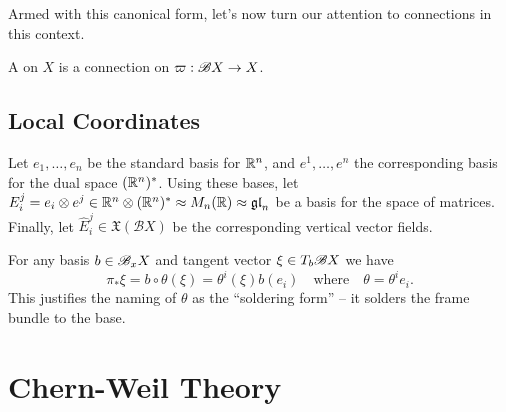 Armed with this canonical form, let's now turn our attention to connections in this context.

\begin{definition}
  A  on $X$ is a connection on $\varpi : \mathscr{B} X \to X$.
\end{definition}

\subsection{Local Coordinates}

Let $e_1,\ldots, e_n$ be the standard basis for $\mathbb{R}^n$, and $e^1,\ldots,e^n$ the corresponding basis for the dual space $(\mathbb{R}^n)^*$. Using these bases, let $E_i^j = e_i\otimes e^j \in \mathbb{R}^n\otimes(\mathbb{R}^n)^* \approx M_n(\mathbb{R}) \approx \mathfrak{gl}_n$ be a basis for the space of matrices. Finally, let $\widehat{E}_i^j\in \mathfrak{X}(\mathscr{B}X)$ be the corresponding vertical vector fields.

For any basis $b\in \mathscr{B}_x X$ and tangent vector $\xi\in T_b \mathscr{B} X$ we have
\[
  \pi_*\xi =  b\circ \theta(\xi) = \theta^i(\xi) b(e_i)\quad\textrm{where}\quad \theta = \theta^i e_i.
\]
This justifies the naming of $\theta$ as the ``soldering form'' -- it solders the frame bundle to the base.


\section{Chern-Weil Theory}

